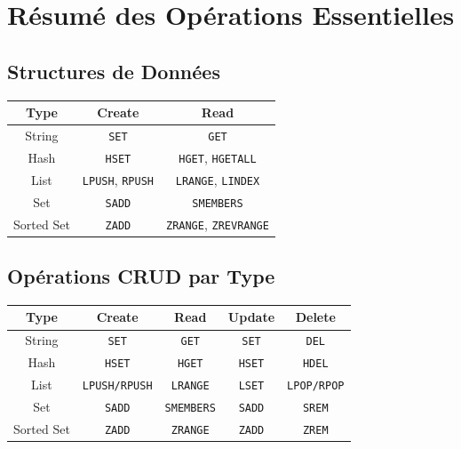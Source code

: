 \documentclass[11pt,a4paper]{article}
\begin{document}
\newpage

\section{Résumé des Opérations Essentielles}

\subsection{Structures de Données}

\begin{table}[h]
\centering
\begin{tabular}{|c|c|c|}
\hline
\textbf{Type} & \textbf{Create} & \textbf{Read} \\
\hline
String & \texttt{SET} & \texttt{GET} \\
\hline
Hash & \texttt{HSET} & \texttt{HGET}, \texttt{HGETALL} \\
\hline
List & \texttt{LPUSH}, \texttt{RPUSH} & \texttt{LRANGE}, \texttt{LINDEX} \\
\hline
Set & \texttt{SADD} & \texttt{SMEMBERS} \\
\hline
Sorted Set & \texttt{ZADD} & \texttt{ZRANGE}, \texttt{ZREVRANGE} \\
\hline
\end{tabular}
\end{table}

\subsection{Opérations CRUD par Type}

\begin{table}[h]
\centering
\begin{tabular}{|c|c|c|c|c|}
\hline
\textbf{Type} & \textbf{Create} & \textbf{Read} & \textbf{Update} & \textbf{Delete} \\
\hline
String & \texttt{SET} & \texttt{GET} & \texttt{SET} & \texttt{DEL} \\
\hline
Hash & \texttt{HSET} & \texttt{HGET} & \texttt{HSET} & \texttt{HDEL} \\
\hline
List & \texttt{LPUSH/RPUSH} & \texttt{LRANGE} & \texttt{LSET} & \texttt{LPOP/RPOP} \\
\hline
Set & \texttt{SADD} & \texttt{SMEMBERS} & \texttt{SADD} & \texttt{SREM} \\
\hline
Sorted Set & \texttt{ZADD} & \texttt{ZRANGE} & \texttt{ZADD} & \texttt{ZREM} \\
\hline
\end{tabular}
\end{table}
\end{document}
